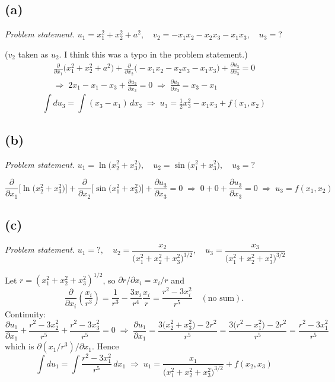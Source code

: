 \documentclass[11pt]{article}
\newcommand{\pd}[2]{\frac{\partial #1}{\partial #2}}
\begin{document}
\subsection*{(a)}

\noindent\textit{Problem statement.} $u_1 = x_1^2 + x_2^2 + a^2, \quad v_2 = -x_1x_2 - x_2x_3 - x_1x_3, \quad u_3 = ?$

\medskip
\noindent ($v_2$ taken as $u_2$. I think this was a typo in the problem statement.)
\begin{gather*}
\pd{}{x_1}\big(x_1^2+x_2^2+a^2\big) + \pd{}{x_2}\big(-x_1x_2-x_2x_3-x_1x_3\big) + \pd{u_3}{x_3} = 0 \\
\Rightarrow\; 2x_1 - x_1 - x_3 + \pd{u_3}{x_3} = 0
\;\Rightarrow\; \pd{u_3}{x_3} = x_3 - x_1
\end{gather*}
\begin{equation*}
\int du_3 = \int (x_3 - x_1)\,dx_3
\;\Rightarrow\;
\boxed{u_3 = \tfrac12 x_3^2 - x_1x_3 + f(x_1,x_2)}
\end{equation*}

\subsection*{(b)}

\noindent\textit{Problem statement.} $u_1 = \ln\!\big(x_2^2 + x_3^2\big), \quad u_2 = \sin\!\big(x_1^2 + x_3^2\big), \quad u_3 = ?$

\begin{equation*}
\pd{}{x_1}\Big[\ln\!\big(x_2^2+x_3^2\big)\Big] + \pd{}{x_2}\Big[\sin\!\big(x_1^2+x_3^2\big)\Big] + \pd{u_3}{x_3} = 0
\;\Rightarrow\; 0 + 0 + \pd{u_3}{x_3} = 0
\;\Rightarrow\;
\boxed{u_3 = f(x_1,x_2)}
\end{equation*}

\subsection*{(c)}

\noindent\textit{Problem statement.} $u_1 = ?, \quad
u_2 = \dfrac{x_2}{\big(x_1^2+x_2^2+x_3^2\big)^{3/2}}, \quad
u_3 = \dfrac{x_3}{\big(x_1^2+x_2^2+x_3^2\big)^{3/2}}$

\medskip
\noindent Let $r = (x_1^2+x_2^2+x_3^2)^{1/2}$, so $\partial r/\partial x_i = x_i/r$ and
\begin{equation*}
\pd{}{x_i}\left(\frac{x_i}{r^3}\right) = \frac{1}{r^3} - \frac{3x_i}{r^4}\frac{x_i}{r} = \frac{r^2 - 3x_i^2}{r^5}
\quad(\text{no sum}).
\end{equation*}
Continuity:
\begin{equation*}
\pd{u_1}{x_1} + \frac{r^2 - 3x_2^2}{r^5} + \frac{r^2 - 3x_3^2}{r^5} = 0
\;\Rightarrow\;
\pd{u_1}{x_1} = \frac{3\big(x_2^2+x_3^2\big) - 2r^2}{r^5} = \frac{3\big(r^2 - x_1^2\big) - 2r^2}{r^5} = \frac{r^2 - 3x_1^2}{r^5}
\end{equation*}
which is $\partial(x_1/r^3)/\partial x_1$. Hence
\begin{equation*}
\int du_1 = \int \frac{r^2 - 3x_1^2}{r^5}\,dx_1
\;\Rightarrow\;
\boxed{u_1 = \frac{x_1}{\big(x_1^2+x_2^2+x_3^2\big)^{3/2}} + f(x_2,x_3)}
\end{equation*}
\end{document}
